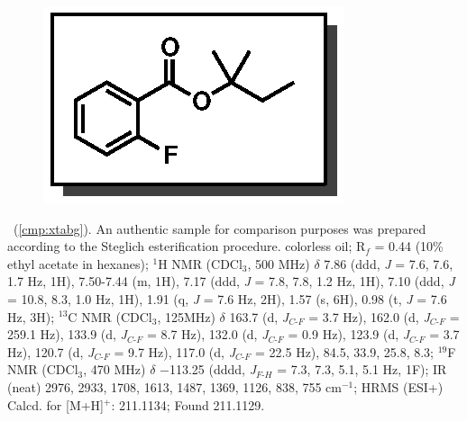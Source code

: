 \vspace{10pt}
\begin{figure}
  \vspace{-30pt}
  \begin{center}
    \includegraphics[scale=0.8]{chp_asymmetric/images/xtabg}
  \end{center}
  \vspace{-40pt}
\end{figure}\noindent \textbf{\CMPxtabg}\ (\ref{cmp:xtabg}). An authentic
sample for comparison purposes was prepared according to the Steglich
esterification procedure. colorless oil;
R$_f$ = 0.44 (10\% ethyl acetate in hexanes); $^1$H NMR (CDCl$_3$, 500 MHz) $\delta$ 7.86 (ddd, \textit{J} = 7.6, 7.6, 1.7 Hz, 1H),
7.50-7.44 (m, 1H), 7.17 (ddd, \textit{J} = 7.8, 7.8, 1.2 Hz, 1H), 7.10 (ddd,
\textit{J} = 10.8, 8.3, 1.0 Hz, 1H), 1.91 (q, \textit{J} = 7.6 Hz, 2H), 1.57 (s,
6H), 0.98 (t, \textit{J} = 7.6 Hz, 3H); $^{13}$C NMR (CDCl$_3$, 125MHz) $\delta$
163.7 (d, \textit{J}$_{C\mbox{-}F}$ = 3.7 Hz), 162.0 (d,
\textit{J}$_{C\mbox{-}F}$ = 259.1 Hz), 133.9 (d, \textit{J}$_{C\mbox{-}F}$ = 8.7
Hz), 132.0 (d, \textit{J}$_{C\mbox{-}F}$ = 0.9 Hz), 123.9 (d,
\textit{J}$_{C\mbox{-}F}$ = 3.7 Hz), 120.7 (d, \textit{J}$_{C\mbox{-}F}$ = 9.7
Hz), 117.0 (d, \textit{J}$_{C\mbox{-}F}$ = 22.5 Hz), 84.5, 33.9, 25.8, 8.3;
$^{19}$F NMR (CDCl$_3$, 470 MHz) $\delta$ $-$113.25 (dddd,
\textit{J}$_{F\mbox{-}H}$ = 7.3, 7.3, 5.1, 5.1 Hz, 1F); IR (neat) 2976, 2933,
1708, 1613, 1487, 1369, 1126, 838, 755 cm$^{-1}$; HRMS (ESI+) Calcd. for
 [M+H]$^+$: 211.1134; Found 211.1129.

